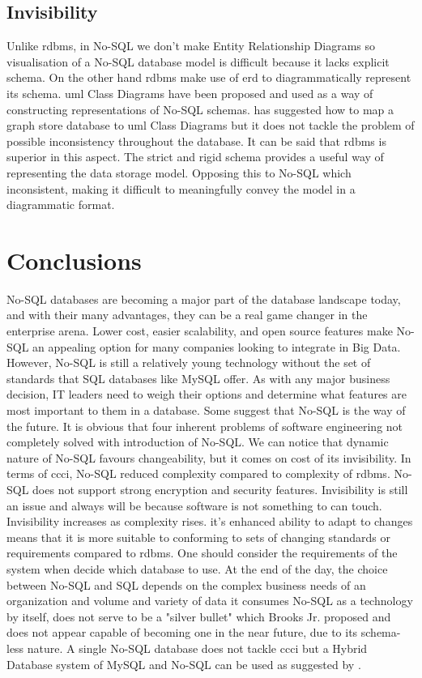\documentclass{article} %
\begin{document}
\subsection{Invisibility}


Unlike \acrshort{rdbms}, in No-SQL we don't make Entity Relationship Diagrams
so visualisation of a No-SQL database model is difficult because it lacks
explicit schema. On the other hand \acrshort{rdbms} make use of \acrshort{erd} to diagrammatically
represent its schema. \acrshort{uml} Class Diagrams have been proposed and used
as a way of constructing representations of No-SQL
schemas. \cite{delfosse2012uml} has suggested how to map
a graph store database to \acrshort{uml} Class Diagrams but it does not 
tackle the problem of possible inconsistency throughout the database.
It can be said that \acrshort{rdbms} is superior in this aspect.
The strict and rigid schema provides a useful way of
representing the data storage model. Opposing this
to No-SQL which inconsistent, making
it difficult to meaningfully convey the model in a
diagrammatic format.



\section{Conclusions}

No-SQL databases are becoming a major part of the database landscape today, and with their many advantages, they can be a real game changer in the enterprise arena. Lower cost, easier scalability, and open source features make No-SQL an appealing option for many companies looking to integrate in Big Data. However, No-SQL is still a relatively young technology without the set of standards that SQL databases like MySQL offer.  As with any major business decision, IT leaders need to weigh their options and determine what features are most important to them in a database. Some suggest that No-SQL is the way of the future. It is obvious that four inherent problems of software engineering not
completely solved with introduction of No-SQL. We can notice that dynamic
nature of No-SQL favours changeability, but it comes on cost of
its invisibility. In terms of \acrshort{ccci}, No-SQL reduced complexity compared 
to complexity of \acrshort{rdbms}. No-SQL does not support strong encryption and security
features. Invisibility is still 
an issue and always will be because software is not something to can touch. 
Invisibility increases as complexity rises.
it's enhanced ability to adapt to changes means that it is more suitable to conforming to sets of changing standards or requirements compared to \acrshort{rdbms}. One should consider the requirements of the system when decide which database to use.  At the end of the day, the choice between No-SQL and SQL depends on the complex business needs of an organization and volume and variety of data it consumes
No-SQL as a technology by itself, does not serve to
be a "silver bullet" which Brooks Jr. proposed and
does not appear capable of becoming one in the near
future, due to its schema-less nature. A single No-SQL database 
does not tackle \acrshort{ccci} but a Hybrid Database system of MySQL and No-SQL 
can be used as suggested by \cite{8528120}.
\end{document}
